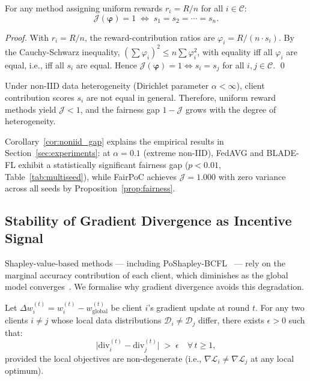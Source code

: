 \begin{proposition}
\label{prop:uniform_fairness}
For any method assigning uniform rewards $r_i = R/n$ for all
$i \in \mathcal{C}$:
\[
  \mathcal{J}(\boldsymbol{\varphi}) = 1
  \;\iff\;
  s_1 = s_2 = \cdots = s_n.
\]
\end{proposition}

\begin{proof}
With $r_i = R/n$, the reward-contribution ratios are
$\varphi_i = R/(n \cdot s_i)$.
By the Cauchy-Schwarz inequality,
$(\sum \varphi_i)^2 \leq n \sum \varphi_i^2$,
with equality iff all $\varphi_i$ are equal, i.e., iff all $s_i$
are equal.
Hence $\mathcal{J}(\boldsymbol{\varphi}) = 1 \iff s_i = s_j$
for all $i, j \in \mathcal{C}$. \qed
\end{proof}

\begin{corollary}
\label{cor:noniid_gap}
Under non-IID data heterogeneity (Dirichlet parameter
$\alpha < \infty$), client contribution scores $s_i$ are not
equal in general.
Therefore, uniform reward methods yield $\mathcal{J} < 1$, and
the fairness gap $1 - \mathcal{J}$ grows with the degree of
heterogeneity.
\end{corollary}

Corollary~\ref{cor:noniid_gap} explains the empirical results in
Section~\ref{sec:experiments}: at $\alpha = 0.1$ (extreme non-IID),
FedAVG and BLADE-FL exhibit a statistically significant fairness
gap ($p < 0.01$, Table~\ref{tab:multiseed}), while FairPoC
achieves $\mathcal{J} = 1.000$ with zero variance across all seeds
by Proposition~\ref{prop:fairness}.

\subsection{Stability of Gradient Divergence as Incentive Signal}

Shapley-value-based methods — including PoShapley-BCFL~\cite{poshapley2023}
— rely on the marginal accuracy contribution of each client,
which diminishes as the global model converges~\cite{poshapley2023}.
We formalise why gradient divergence avoids this degradation.

\begin{proposition}
\label{prop:stability}
Let $\Delta w_i^{(t)} = w_i^{(t)} - w_{\mathrm{global}}^{(t)}$ be
client $i$'s gradient update at round $t$.
For any two clients $i \neq j$ whose local data distributions
$\mathcal{D}_i \neq \mathcal{D}_j$ differ,
there exists $\epsilon > 0$ such that:
\[
  \bigl|\mathrm{div}_i^{(t)} - \mathrm{div}_j^{(t)}\bigr| \;>\; \epsilon
  \quad \forall\, t \geq 1,
\]
provided the local objectives are non-degenerate
(i.e., $\nabla \mathcal{L}_i \neq \nabla \mathcal{L}_j$ at any local
optimum).
\end{proposition}

